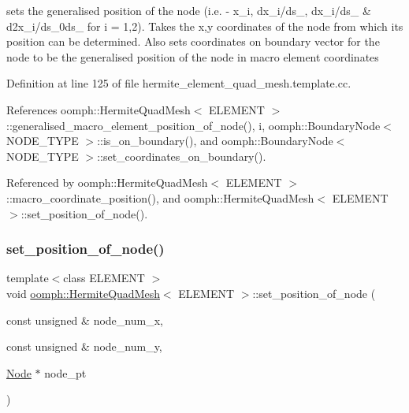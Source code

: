 sets the generalised position of the node (i.\+e. -\/ x\+\_\+i, dx\+\_\+i/ds\+\_, dx\+\_\+i/ds\+\_ \& d2x\+\_\+i/ds\+\_\+0ds\+\_ for i = 1,2). Takes the x,y coordinates of the node from which its position can be determined. Also sets coordinates on boundary vector for the node to be the generalised position of the node in macro element coordinates 



Definition at line 125 of file hermite\+\_\+element\+\_\+quad\+\_\+mesh.\+template.\+cc.



References oomph\+::\+Hermite\+Quad\+Mesh$<$ E\+L\+E\+M\+E\+N\+T $>$\+::generalised\+\_\+macro\+\_\+element\+\_\+position\+\_\+of\+\_\+node(), i, oomph\+::\+Boundary\+Node$<$ N\+O\+D\+E\+\_\+\+T\+Y\+P\+E $>$\+::is\+\_\+on\+\_\+boundary(), and oomph\+::\+Boundary\+Node$<$ N\+O\+D\+E\+\_\+\+T\+Y\+P\+E $>$\+::set\+\_\+coordinates\+\_\+on\+\_\+boundary().



Referenced by oomph\+::\+Hermite\+Quad\+Mesh$<$ E\+L\+E\+M\+E\+N\+T $>$\+::macro\+\_\+coordinate\+\_\+position(), and oomph\+::\+Hermite\+Quad\+Mesh$<$ E\+L\+E\+M\+E\+N\+T $>$\+::set\+\_\+position\+\_\+of\+\_\+node().

\mbox{\label{classoomph_1_1HermiteQuadMesh_abaac1dedc4a2e578b73b0d849c9a68e8}} 
\subsubsection{\texorpdfstring{set\+\_\+position\+\_\+of\+\_\+node()}{set\_position\_of\_node()}}
{\footnotesize\ttfamily template$<$class E\+L\+E\+M\+E\+NT $>$ \\
void \hyperlink{classoomph_1_1HermiteQuadMesh}{oomph\+::\+Hermite\+Quad\+Mesh}$<$ E\+L\+E\+M\+E\+NT $>$\+::set\+\_\+position\+\_\+of\+\_\+node (\begin{DoxyParamCaption}\item[{const unsigned \&}]{node\+\_\+num\+\_\+x,  }\item[{const unsigned \&}]{node\+\_\+num\+\_\+y,  }\item[{\hyperlink{classoomph_1_1Node}{Node} $\ast$}]{node\+\_\+pt }\end{DoxyParamCaption})\hspace{0.3cm}{\ttfamily [private]}}



